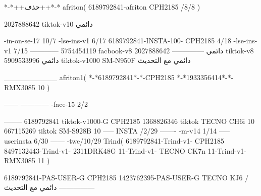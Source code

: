 *-*++حذف++*-*
afriton(
6189792841-afriton CPH2185  /8/8
)

2027888642 tiktok-v10
دائمي

-in-on-se-17 10/7
-lse-ins-v1 6/17
6189792841-INSTA-100- CPH2185 4/18
-lse-ins-v1 7/15
------------
5754454119 facbook-v8
دائمي
--------------
2027888642 tiktok-v8
دائمي
5909533996 tiktok-v1000  SM-N950F
دائمي مع التحديث

__________
afriton1(
*-*6189792841*-*-CPH2185
*-*1933356414*-*- RMX3085 10
)


------
------------
-face-15 2/2

--------
6189792841 tiktok-v1000-G CPH2185 
1368826346 tiktok  TECNO CH6i 10
667115269 tiktok  SM-S928B 10
-----
 INSTA /2/29
-------
-m-v14 1/14
-----
userinsta 6/30
------
-twe/10/29
Trind(
6189792841-Trind-v1- CPH2185 
8497132443-Trind-v1- 2311DRK48G 11-Trind-v1- TECNO CK7n 11-Trind-v1- RMX3085 11\1
)


6189792841-PAS-USER-G CPH2185 
1423762395-PAS-USER-G TECNO KJ6  /دائمي مع التحديث
    ---------------
